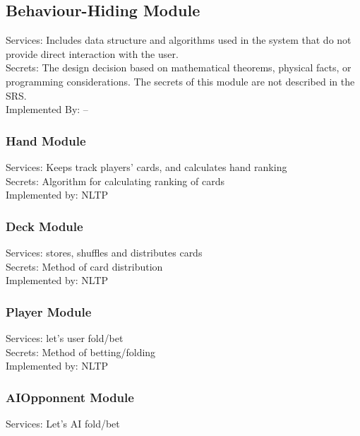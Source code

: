 \documentclass[11pt]{article}
\begin{document}
    \subsection{Behaviour-Hiding Module}
    Services: Includes data structure and algorithms used in the system that do not provide direct interaction with the user. \\
    Secrets: The design decision based on mathematical theorems, physical facts, or programming considerations. The secrets of this module are not described in the SRS. \\
    Implemented By: –\\

    \subsubsection{Hand Module}
    Services: Keeps track players’ cards, and calculates hand ranking\\

    Secrets: Algorithm for calculating ranking of cards \\

    Implemented by: NLTP\\

    \subsubsection{Deck Module}
    Services: stores, shuffles and distributes cards\\
    Secrets: Method of card distribution\\
    Implemented by: NLTP\\

    \subsubsection{Player Module}
    Services: let’s user fold/bet\\

    Secrets: Method of betting/folding\\

    Implemented by: NLTP\\

    \subsubsection{AIOpponnent Module}
    Services: Let’s AI fold/bet\\
\end{document}
